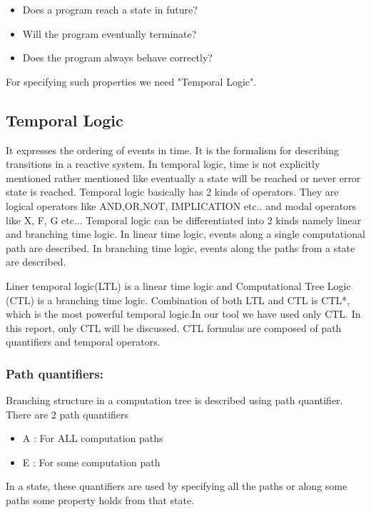 \begin{itemize}
\item Does a program reach a state in future?
\item Will the program eventually terminate?
\item Does the program always behave correctly?
\end{itemize}

For specifying such properties we need "Temporal Logic". 

\subsection{Temporal Logic}
It expresses the ordering of events in time. It is the formalism for describing transitions in a reactive system. In temporal logic, time is not explicitly mentioned rather mentioned like eventually a state will be reached or never error state is reached. Temporal logic basically has 2 kinds of operators. They are logical operators like AND,OR,NOT, IMPLICATION etc.. and modal operators like X, F, G etc... Temporal logic can be differentiated into 2 kinds namely linear and branching time logic. In linear time logic, events along a single computational path are described. In branching time logic, events along the paths from a state are described.

Liner temporal logic(LTL) is a linear time logic and Computational Tree Logic (CTL) is a branching time logic. Combination of both LTL and CTL is CTL*, which is the most powerful temporal logic.In our tool we have used only CTL. In this report, only CTL will be discussed. CTL formulas are composed of path quantifiers and temporal operators. 

\subsubsection*{Path quantifiers:}
Branching structure in a computation tree is described using path quantifier. There are 2 path quantifiers\cite{Clarke 1999}
\begin{itemize}
\item A : For ALL computation paths
\item E : For some computation path
\end{itemize}
In a state, these quantifiers are used by specifying all the paths or along some paths some property holds from that state.

